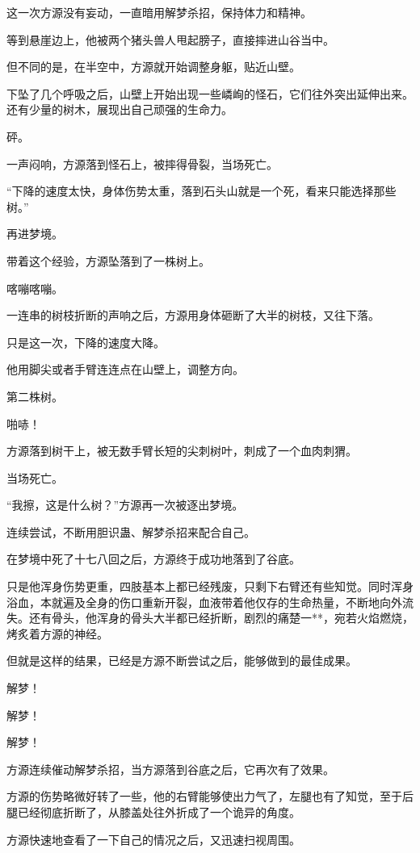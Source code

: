 \begin{this_body}
这一次方源没有妄动，一直暗用解梦杀招，保持体力和精神。

等到悬崖边上，他被两个猪头兽人甩起膀子，直接摔进山谷当中。

但不同的是，在半空中，方源就开始调整身躯，贴近山壁。

下坠了几个呼吸之后，山壁上开始出现一些嶙峋的怪石，它们往外突出延伸出来。还有少量的树木，展现出自己顽强的生命力。

砰。

一声闷响，方源落到怪石上，被摔得骨裂，当场死亡。

“下降的速度太快，身体伤势太重，落到石头山就是一个死，看来只能选择那些树。”

再进梦境。

带着这个经验，方源坠落到了一株树上。

喀嘣喀嘣。

一连串的树枝折断的声响之后，方源用身体砸断了大半的树枝，又往下落。

只是这一次，下降的速度大降。

他用脚尖或者手臂连连点在山壁上，调整方向。

第二株树。

啪哧！

方源落到树干上，被无数手臂长短的尖刺树叶，刺成了一个血肉刺猬。

当场死亡。

“我擦，这是什么树？”方源再一次被逐出梦境。

连续尝试，不断用胆识蛊、解梦杀招来配合自己。

在梦境中死了十七八回之后，方源终于成功地落到了谷底。

只是他浑身伤势更重，四肢基本上都已经残废，只剩下右臂还有些知觉。同时浑身浴血，本就遍及全身的伤口重新开裂，血液带着他仅存的生命热量，不断地向外流失。还有骨头，他浑身的骨头大半都已经折断，剧烈的痛楚一**，宛若火焰燃烧，烤炙着方源的神经。

但就是这样的结果，已经是方源不断尝试之后，能够做到的最佳成果。

解梦！

解梦！

解梦！

方源连续催动解梦杀招，当方源落到谷底之后，它再次有了效果。

方源的伤势略微好转了一些，他的右臂能够使出力气了，左腿也有了知觉，至于后腿已经彻底折断了，从膝盖处往外折成了一个诡异的角度。

方源快速地查看了一下自己的情况之后，又迅速扫视周围。


\end{this_body}
